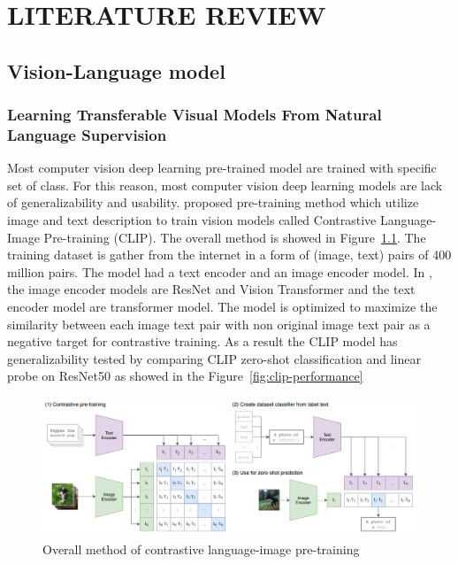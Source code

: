 \chapter{LITERATURE REVIEW}

\section{Vision-Language model}
\subsection{Learning Transferable Visual Models From Natural Language Supervision}
Most computer vision deep learning pre-trained model are trained with specific set of class.
For this reason, most computer vision deep learning models are lack of generalizability and usability.
 proposed pre-training method which utilize image and text description to train vision models called Contrastive Language-Image Pre-training (CLIP).
The overall method is showed in Figure~\ref{fig:clip}.
The training dataset is gather from the internet in a form of (image, text) pairs of 400 million pairs.
The model had a text encoder and an image encoder model.
In , the image encoder models are ResNet and Vision Transformer and the text encoder model are transformer model.
The model is optimized to maximize the similarity between each image text pair with non original image text pair as a negative target for contrastive training.
As a result the CLIP model has generalizability tested by comparing CLIP zero-shot classification and linear probe on ResNet50 as showed in the Figure~\ref{fig:clip-performance}

\begin{figure}[h]
    \caption{Overall method of contrastive language-image pre-training}
    \label{fig:clip}
    \centering
    \includegraphics[width=1\textwidth]{Images/CLIP.png}
    \small
\end{figure}

